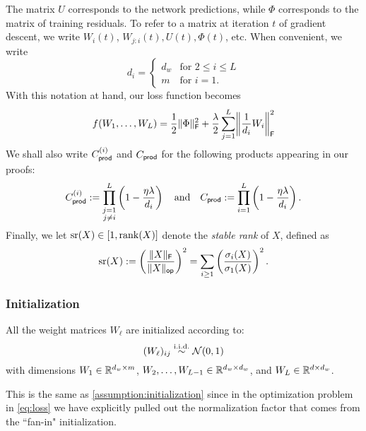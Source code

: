 The matrix $U$ corresponds to the network predictions,
while $\Phi$ corresponds to the matrix of training residuals.
To refer to a matrix at iteration $t$ of gradient descent, we write $W_{i}(t)$, $W_{j:i}(t), U(t), \Phi(t)$, etc.
When convenient, we write
\begin{equation}
	d_i = \begin{cases}
		d_w & \text{for $2\le i \le L$} \\
		m   & \text{for $i=1$.}
	\end{cases}
\end{equation}
With this notation at hand, our loss function becomes
\begin{equation}
	f(W_1, \ldots, W_L)
	= \frac{1}{2} \frobnorm{\Phi}^2
	+ \frac{\lambda}{2} \sum_{j=1}^{L}
    \frobnorm*{\frac{1}{d_i} W_i}^2 \\
	\label{eq:loss}
\end{equation}
We shall also write $C_{\mathsf{prod}}^{({i})}$ and $C_{\mathsf{prod}}$ for the following products appearing in our proofs:
\begin{equation}
	C_{\mathsf{prod}}^{({i})} := \prod_{\substack{j = 1\\j \neq i}}^{L} \left(1 - \frac{\eta \lambda}{d_i} \right) \quad \text{and} \quad
	C_{\mathsf{prod}} := \prod_{i = 1}^{L} \left(1 - \frac{\eta \lambda}{d_i}\right).
	\label{eq:c-prod-i}
\end{equation}
Finally, we let $\operatorname{\mathrm{sr}}(X) \in [1, \mathrm{rank}(X)]$ denote the \emph{stable rank} of $X$, defined as 
\begin{equation}
  \operatorname{\mathrm{sr}}(X) := \left( \frac{\lVert X\rVert_{\mathsf{F}}}{\lVert X\rVert_{\mathsf{op}}} \right)^2 =
  \sum_{i \geq 1} \left( \frac{\sigma_{i}(X)}{\sigma_{1}(X)} \right)^2.
  \label{eq:stable-rank}
\end{equation}

\subsubsection{Initialization} \label{sec:subsec:subsubsec:initialization}
\begin{assumption}[Initialization]
	All the weight matrices $W_\ell$ are initialized according to:
	\[
		(W_{\ell})_{ij} \overset{\mathrm{i.i.d.}}{\sim} \mathcal{N}(0, 1)
	\]
	with dimensions $W_{1} \in \mathbb{R}^{d_w \times m}$, $W_{2}, \dots, W_{L-1} \in \mathbb{R}^{d_w \times d_w}$,
	and $W_{L} \in \mathbb{R}^{d \times d_w}$.
\end{assumption}
This is the same as \cref{assumption:initialization} since in the optimization problem in \cref{eq:loss} we have explicitly pulled out the normalization factor that comes from the ``fan-in" initialization.

